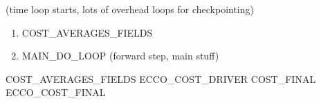 \documentclass[a4paper,10pt]{article}
\newcommand{\ai}{\hspace{\algorithmicindent}}
\begin{document}
\begin{algorithm}
\begin{algorithmic}
   \STATE (time loop starts, lots of overhead loops for checkpointing)
      \STATE 
	\begin{enumerate}
           \item COST\_AVERAGES\_FIELDS
           \item MAIN\_DO\_LOOP (forward step, main stuff)
        \end{enumerate}
   \ENDFOR
   \STATE COST\_AVERAGES\_FIELDS
   \STATE ECCO\_COST\_DRIVER
   \STATE COST\_FINAL
   \STATE\ai ECCO\_COST\_FINAL
  \end{algorithmic}
\end{algorithm}
\end{document}
